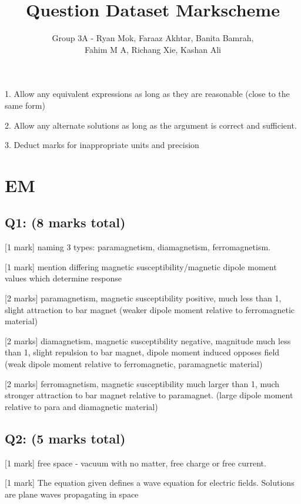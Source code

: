 \documentclass[a4paper,11pt]{article}
\begin{document}
\title{Question Dataset Markscheme}
\author{Group 3A - Ryan Mok, Faraaz Akhtar, Banita Bamrah, \\ Fahim M A, Richang Xie, Kashan Ali }
\date{}
\maketitle

1. Allow any equivalent expressions as long as they are reasonable (close to the same form)

2. Allow any alternate solutions as long as the argument is correct and sufficient. 

3. Deduct marks for inappropriate units and precision

\section{EM}

\subsection*{Q1: (8 marks total)}

[1 mark] naming 3 types: paramagnetism, diamagnetism, ferromagnetism. 

[1 mark] mention differing magnetic susceptibility/magnetic dipole moment values which determine response 

[2 marks] paramagnetism, magnetic susceptibility positive, much less than 1, slight attraction to bar magnet (weaker dipole moment relative to ferromagnetic material)

[2 marks] diamagnetism, magnetic susceptibility negative, magnitude much less than 1, slight repulsion to bar magnet, dipole moment induced opposes field (weak dipole moment relative to ferromagnetic, paramagnetic material)

[2 marks] ferromagnetism, magnetic susceptibility much larger than 1, much stronger attraction to bar magnet relative to paramagnet. (large dipole moment relative to para and diamagnetic material)

\subsection*{Q2: (5 marks total)}

[1 mark] free space - vacuum with no matter, free charge or free current.

[1 mark] The equation given defines a wave equation for electric fields. Solutions are plane waves propagating in space
\end{document}
